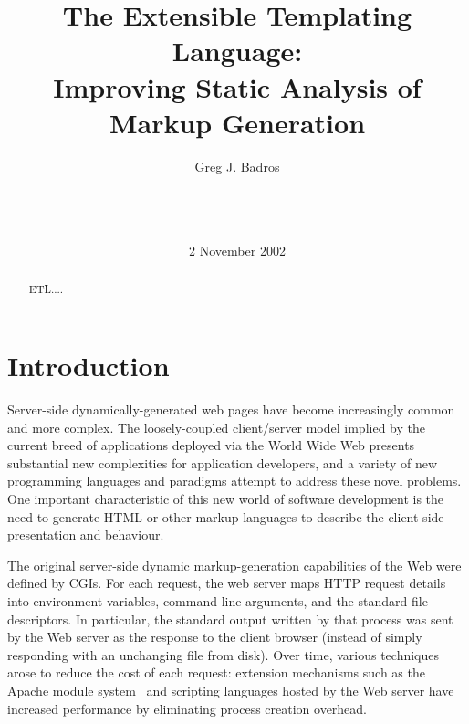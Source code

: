 \documentclass{www2003-submission}
\newcommand{\B}{\discretionary{}{}{}}
\begin{document}
%
\title{The Extensible Templating Language: \\
       Improving Static Analysis of Markup Generation}


\author{
%
\alignauthor Greg J. Badros\\
       \\
       \\
       \\
}
\date{2 November 2002}
\maketitle
\begin{abstract}
ETL....
\end{abstract}




\section{Introduction}

Server-side dynamically-generated web pages have become increasingly
common and more complex.  The loosely-coupled client/\B{}server model
implied by the current breed of applications deployed via the World
Wide Web presents substantial new complexities for application
developers, and a variety of new programming languages and paradigms
attempt to address these novel problems.  One important characteristic
of this new world of software development is the need to generate HTML
or other markup languages to describe the client-side presentation and
behaviour.

The original server-side dynamic markup-generation capabilities of the
Web were defined by CGIs.\cite{CGI} For each request, the web server
maps HTTP request details into environment variables, command-line
arguments, and the standard file descriptors.  In particular, the
standard output written by that process was sent by the Web server as
the response to the client browser (instead of simply responding with
an unchanging file from disk).  Over time, various techniques arose to
reduce the cost of each request: extension mechanisms such as the
Apache module system~\cite{ApacheModules} and scripting languages
hosted by the Web server have increased performance by eliminating
process creation overhead.
\end{document}
